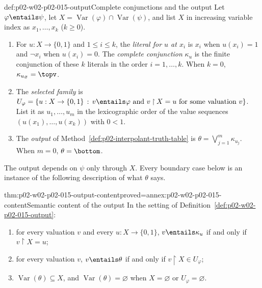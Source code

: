 \begin{hbdefinition}{def:p02-w02-p02-015-output}{Complete conjunctions and the output}
Let \(\varphi\entails\psi\), let
\(X=\operatorname{Var}(\varphi)\cap\operatorname{Var}(\psi)\), and list \(X\)
in increasing variable index as \(x_1,\ldots,x_k\) (\(k\geq 0\)).
\begin{enumerate}
  \item For \(u:X\to\{0,1\}\) and \(1\leq i\leq k\), the \emph{literal for
        \(u\) at \(x_i\)} is \(x_i\) when \(u(x_i)=1\) and \(\neg x_i\) when
        \(u(x_i)=0\).  The \emph{complete conjunction} \(\kappa_u\) is the
        finite conjunction of these \(k\) literals in the order
        \(i=1,\ldots,k\).  When \(k=0\), \(\kappa_{u_\varnothing}=\topv\).
  \item The \emph{selected family} is
        \(U_\varphi=\{u:X\to\{0,1\}\,:\,
        v\entails\varphi\text{ and }v\mathbin{\upharpoonright}X=u
        \text{ for some valuation }v\}\).
        List it as \(u_1,\ldots,u_m\) in the lexicographic order of the value
        sequences \((u(x_1),\ldots,u(x_k))\) with \(0<1\).
  \item The \emph{output} of Method~\ref{def:p02-interpolant-truth-table} is
        \(\theta=\bigvee_{j=1}^{m}\kappa_{u_j}\).  When \(m=0\),
        \(\theta=\bottom\).
\end{enumerate}
\end{hbdefinition}

The output depends on \(\psi\) only through \(X\).  Every boundary case below
is an instance of the following description of what \(\theta\) says.

\begin{hblemma}{thm:p02-w02-p02-015-output-content}{proved=annex:p02-w02-p02-015-content}{Semantic content of the output}
In the setting of Definition~\ref{def:p02-w02-p02-015-output}:
\begin{enumerate}
  \item for every valuation \(v\) and every \(u:X\to\{0,1\}\),
        \(v\entails\kappa_u\) if and only if
        \(v\mathbin{\upharpoonright}X=u\);
  \item for every valuation \(v\), \(v\entails\theta\) if and only if
        \(v\mathbin{\upharpoonright}X\in U_\varphi\);
  \item \(\operatorname{Var}(\theta)\subseteq X\), and
        \(\operatorname{Var}(\theta)=\varnothing\) when \(X=\varnothing\) or
        \(U_\varphi=\varnothing\).
\end{enumerate}
\end{hblemma}

